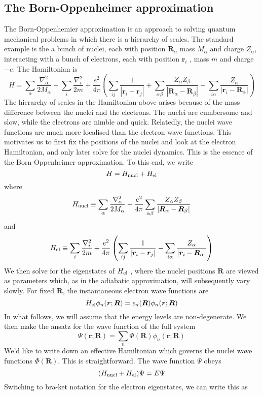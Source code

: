 \documentclass[cyan]{elegantnote}
\begin{document}
\subsection{The Born-Oppenheimer approximation}
The Born-Oppenhemier approximation is an approach to solving quantum mechanical problems in which there is a hierarchy of scales. 
The standard example is the a bunch of nuclei, each with position $\bm{R}_{\alpha}$ mass $M_{\alpha}$ and charge $Z_{\alpha}$, interacting with a bunch of electrons, each with position $\bm{r}_i$ , mass $m$ and charge $-e$. 
The Hamiltonian is
\[H = \sum_{\alpha} \frac{\nabla^2_{\alpha}}{2M_{\alpha}} + \sum_{i} \frac{\nabla^2_{i}}{2m} + \frac{e^2}{4\pi} \left(\sum_{ij} \frac{1}{|\bm{r}_i - \bm{r}_j|} + \sum_{\alpha \beta} \frac{Z_{\alpha} Z_{\beta}}{|\bm{R}_{\alpha} - \bm{R}_{\beta}|} - \sum_{i\alpha} \frac{Z_{\alpha}}{|\bm{r}_i - \bm{R}_{\alpha}|} \right)\]
The hierarchy of scales in the Hamiltonian above arises because of the mass difference between the nuclei and the electrons. The nuclei are cumbersome and slow, while the
electrons are nimble and quick. 
Relatedly, the nuclei wave functions are much more
localised than the electron wave functions. This motivates us to first fix the positions of the nuclei and look at the electron Hamiltonian, and only later solve for the nuclei dynamics. This is the essence of the Born-Oppenheimer approximation.
To this end, we write
\[H = H_{\rm nucl} + H_{\rm el}\]
where
\[H_{\rm nucl} \equiv \sum_{\alpha} \frac{\nabla^2_{\alpha}}{2M_{\alpha}} + \frac{e^2}{4\pi}  \sum_{\alpha \beta} \frac{Z_{\alpha} Z_{\beta}}{|\bm{R}_{\alpha} - \bm{R}_{\beta}|}\]
and
\[H_{\rm el} \equiv  \sum_{i} \frac{\nabla^2_{i}}{2m} + \frac{e^2}{4\pi} \left(\sum_{ij} \frac{1}{|\bm{r}_i - \bm{r}_j|}  - \sum_{i\alpha} \frac{Z_{\alpha}}{|\bm{r}_i - \bm{R}_{\alpha}|} \right)\]
We then solve for the eigenstates of $H_{\rm el}$ , where the nuclei positions $\bm{R}$ are viewed as parameters which, as in the adiabatic approximation, will subsequently vary slowly.
For fixed $\bm{R}$, the instantaneous electron wave functions are
\[H_{\rm el} \phi_n(\bm{r};\bm{R}) = \epsilon_n(\bm{R}) \phi_n(\bm{r};\bm{R})\]
In what follows, we will assume that the energy levels are non-degenerate. We then make the ansatz for the wave function of the full system
\[\Psi(\bm{r};\bm{R}) = \sum_n \Phi(\bm{R})\phi_n(\bm{r};\bm{R})\]
We'd like to write down an effective Hamiltonian which governs the nuclei wave functions $\Phi(\bm{R})$. 
This is straightforward. The wave function $\Psi$ obeys
\[(H_{\rm nucl} + H_{\rm el}) \Psi = E\Psi\]
Switching to bra-ket notation for the electron eigenstates, we can write this as
\end{document}
